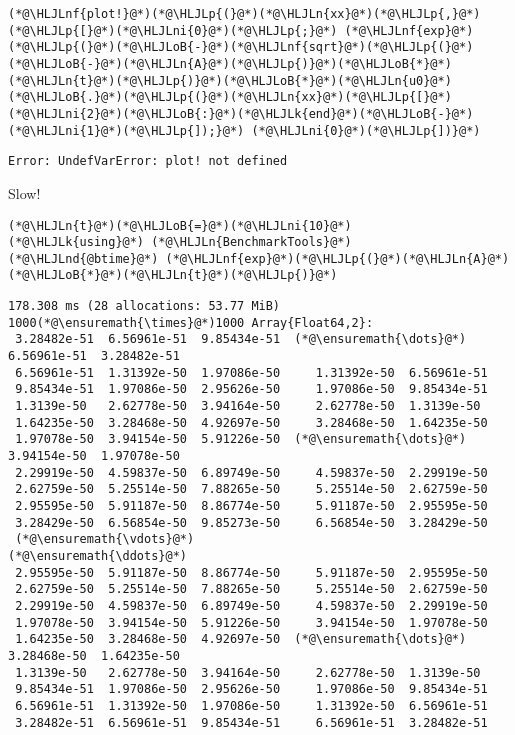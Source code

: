 \documentclass[12pt,a4paper]{article}
\newcommand{\HLJLk}[1]{\textcolor[RGB]{148,91,176}{\textbf{#1}}}
\newcommand{\HLJLn}[1]{#1}
\newcommand{\HLJLnd}[1]{\textcolor[RGB]{214,102,97}{#1}}
\newcommand{\HLJLnf}[1]{\textcolor[RGB]{66,102,213}{#1}}
\newcommand{\HLJLni}[1]{\textcolor[RGB]{59,151,46}{#1}}
\newcommand{\HLJLoB}[1]{\textcolor[RGB]{102,102,102}{\textbf{#1}}}
\newcommand{\HLJLp}[1]{#1}
\begin{document}
\begin{lstlisting}
(*@\HLJLnf{plot!}@*)(*@\HLJLp{(}@*)(*@\HLJLn{xx}@*)(*@\HLJLp{,}@*) (*@\HLJLp{[}@*)(*@\HLJLni{0}@*)(*@\HLJLp{;}@*) (*@\HLJLnf{exp}@*)(*@\HLJLp{(}@*)(*@\HLJLoB{-}@*)(*@\HLJLnf{sqrt}@*)(*@\HLJLp{(}@*)(*@\HLJLoB{-}@*)(*@\HLJLn{A}@*)(*@\HLJLp{)}@*)(*@\HLJLoB{*}@*)(*@\HLJLn{t}@*)(*@\HLJLp{)}@*)(*@\HLJLoB{*}@*)(*@\HLJLn{u0}@*)(*@\HLJLoB{.}@*)(*@\HLJLp{(}@*)(*@\HLJLn{xx}@*)(*@\HLJLp{[}@*)(*@\HLJLni{2}@*)(*@\HLJLoB{:}@*)(*@\HLJLk{end}@*)(*@\HLJLoB{-}@*)(*@\HLJLni{1}@*)(*@\HLJLp{]);}@*) (*@\HLJLni{0}@*)(*@\HLJLp{])}@*)
\end{lstlisting}

\begin{lstlisting}
Error: UndefVarError: plot! not defined
\end{lstlisting}


Slow!


\begin{lstlisting}
(*@\HLJLn{t}@*)(*@\HLJLoB{=}@*)(*@\HLJLni{10}@*)
(*@\HLJLk{using}@*) (*@\HLJLn{BenchmarkTools}@*)
(*@\HLJLnd{@btime}@*) (*@\HLJLnf{exp}@*)(*@\HLJLp{(}@*)(*@\HLJLn{A}@*)(*@\HLJLoB{*}@*)(*@\HLJLn{t}@*)(*@\HLJLp{)}@*)
\end{lstlisting}

\begin{lstlisting}
178.308 ms (28 allocations: 53.77 MiB)
1000(*@\ensuremath{\times}@*)1000 Array{Float64,2}:
 3.28482e-51  6.56961e-51  9.85434e-51  (*@\ensuremath{\dots}@*)  6.56961e-51  3.28482e-51
 6.56961e-51  1.31392e-50  1.97086e-50     1.31392e-50  6.56961e-51
 9.85434e-51  1.97086e-50  2.95626e-50     1.97086e-50  9.85434e-51
 1.3139e-50   2.62778e-50  3.94164e-50     2.62778e-50  1.3139e-50 
 1.64235e-50  3.28468e-50  4.92697e-50     3.28468e-50  1.64235e-50
 1.97078e-50  3.94154e-50  5.91226e-50  (*@\ensuremath{\dots}@*)  3.94154e-50  1.97078e-50
 2.29919e-50  4.59837e-50  6.89749e-50     4.59837e-50  2.29919e-50
 2.62759e-50  5.25514e-50  7.88265e-50     5.25514e-50  2.62759e-50
 2.95595e-50  5.91187e-50  8.86774e-50     5.91187e-50  2.95595e-50
 3.28429e-50  6.56854e-50  9.85273e-50     6.56854e-50  3.28429e-50
 (*@\ensuremath{\vdots}@*)                                      (*@\ensuremath{\ddots}@*)                          
 2.95595e-50  5.91187e-50  8.86774e-50     5.91187e-50  2.95595e-50
 2.62759e-50  5.25514e-50  7.88265e-50     5.25514e-50  2.62759e-50
 2.29919e-50  4.59837e-50  6.89749e-50     4.59837e-50  2.29919e-50
 1.97078e-50  3.94154e-50  5.91226e-50     3.94154e-50  1.97078e-50
 1.64235e-50  3.28468e-50  4.92697e-50  (*@\ensuremath{\dots}@*)  3.28468e-50  1.64235e-50
 1.3139e-50   2.62778e-50  3.94164e-50     2.62778e-50  1.3139e-50 
 9.85434e-51  1.97086e-50  2.95626e-50     1.97086e-50  9.85434e-51
 6.56961e-51  1.31392e-50  1.97086e-50     1.31392e-50  6.56961e-51
 3.28482e-51  6.56961e-51  9.85434e-51     6.56961e-51  3.28482e-51
\end{lstlisting}
\end{document}
